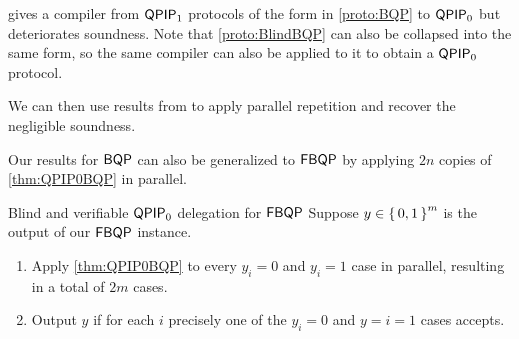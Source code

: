 \cite{mahadev_delegation} gives a compiler from $\operatorname{\mathsf{QPIP}}_1$ protocols of the form in \cref{proto:BQP} to $\operatorname{\mathsf{QPIP}}_0$ but deteriorates soundness.
Note that \cref{proto:BlindBQP} can also be collapsed into the same form, so the same compiler can also be applied to it to obtain a $\operatorname{\mathsf{QPIP}}_0$ protocol.

We can then use results from \cite{parallelrep} to apply parallel repetition and recover the negligible soundness.

Our results for $\operatorname{\mathsf{BQP}}$ can also be generalized to $\operatorname{\mathsf{FBQP}}$ by applying $2n$ copies of \cref{thm:QPIP0BQP} in parallel.

\begin{protocol}{Blind and verifiable $\operatorname{\mathsf{QPIP}}_0$ delegation for $\operatorname{\mathsf{FBQP}}$}
	\label{QPIP0FBQP}
	Suppose $y\in\set{0,1}^m$ is the output of our $\operatorname{\mathsf{FBQP}}$ instance.
	\begin{enumerate}
		\item Apply \cref{thm:QPIP0BQP} to every $y_i=0$ and $y_i=1$ case in parallel, resulting in a total of $2m$ cases.
		\item Output $y$ if for each $i$ precisely one of the $y_i=0$ and $y=i=1$ cases accepts.
	\end{enumerate}
\end{protocol}

